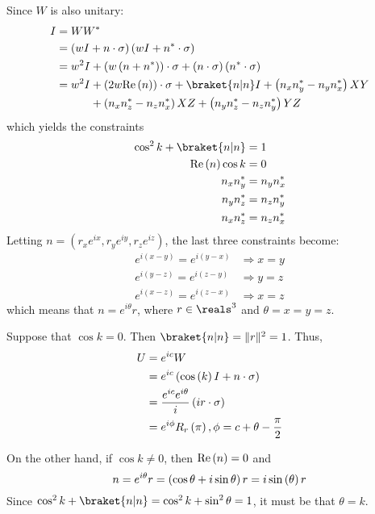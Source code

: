 \begin{enumerate}
%
Since $W$ is also unitary:
%
\begin{align*}
I &= W W^* \\
&= \left( w I + n \cdot \sigma \right) \left( w I + n^* \cdot \sigma \right) \\
&= w^2 I + \left( w \left( n + n^* \right) \right) \cdot \sigma + \left( n \cdot \sigma \right) \left( n^* \cdot \sigma \right) \\
&= w^2 I + \left( 2 w \re{n} \right) \cdot \sigma + \braket{n|n} I +\left( n_x n_y^* - n_y n_x^* \right) XY \notag \\
&\phantom{{}= w^2 I} + \left( n_x n_z^* - n_z n_x^* \right) XZ + \left( n_y n_z^* - n_z n_y^* \right) YZ
\end{align*}
%
which yields the constraints
%
\begin{align*}
\cos^2 k + \braket{n|n} &= 1 \\
\re{n} \cos k &= 0 \\
n_x n_y^* &= n_y n_x^* \\
n_y n_z^* &= n_z n_y^* \\
n_x n_z^* &= n_z n_x^*
\end{align*}
%
Letting $n = \left( r_x e^{ix}, r_y e^{iy}, r_z e^{iz} \right)$, the last three constraints become:
%
\begin{align*}
e^{i \left( x - y \right)} = e^{i \left( y - x \right)} &\Rightarrow x = y \\
e^{i \left( y - z \right)} = e^{i \left( z - y \right)} &\Rightarrow y = z \\
e^{i \left( x - z \right)} = e^{i \left( z - x \right)} &\Rightarrow x = z
\end{align*}
%
which means that $n = e^{i \theta} r$, where $r \in \reals^3$ and $\theta = x = y = z$.
%
\par Suppose that $\cos k = 0$.
%
Then $\braket{n|n} = \lVert r \rVert ^2 = 1$.
%
Thus,
%
\begin{align*}
U &= e^{ic} W \\
&= e^{ic} \left( \cos \left( k \right) I + n \cdot \sigma \right) \\
&= \frac{e^{ic} e^{i \theta}}{i} \left( i r \cdot \sigma \right) \\
&= e^{i \phi} R_r \left( \pi \right), \phi = c + \theta - \frac{\pi}{2}
\end{align*}
%
\par On the other hand, if $\cos k \ne 0$, then $\mathrm{Re} \left( n \right) = 0$ and
$$
n = e^{i \theta} r = \left( \cos \theta + i \sin \theta \right) r = i \sin \left( \theta \right) r
$$
%
Since $\cos^2 k + \braket{n|n} = \cos^2 k + \sin^2 \theta = 1$, it must be that $\theta = k$.

\end{enumerate}
